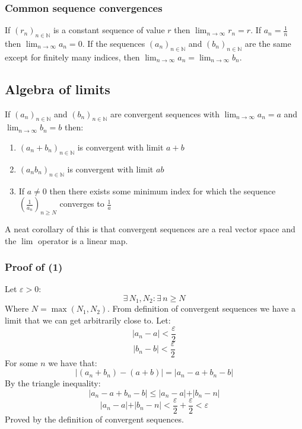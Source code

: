 \documentclass[12pt]{article}
\newcommand{\seq}[2]{(#1_#2)_{#2\in\mathbb{N}}}
\begin{document}
\subsubsection*{Common sequence convergences}
If \(\seq{r}{n}\) is a constant sequence of value \(r\) then \(\lim_{n\to\infty}r_n=r\). If \(a_n=\frac{1}{n}\) then \(\lim_{n\to\infty}a_n=0\). If the sequences \(\seq{a}{n}\) and \(\seq{b}{n}\) are the same except for finitely many indices, then \(\lim_{n\to\infty}a_n=\lim_{n\to\infty}b_n\).
\subsection*{Algebra of limits}
If \(\seq{a}{n}\) and \(\seq{b}{n}\) are convergent sequences with \(\lim_{n\to\infty}a_n=a\) and \(\lim_{n\to\infty}b_n=b\) then:
\begin{enumerate}
    \item \(\seq{a_n+b}{n}\) is convergent with limit \(a+b\)
    \item \(\seq{a_nb}{n}\) is convergent with limit \(ab\)
    \item If \(a\ne0\) then there exists some minimum index for which the sequence \(\left(\frac{1}{a_n}\right)_{n\geq N}\) converges to \(\frac{1}{a}\)
\end{enumerate}
A neat corollary of this is that convergent sequences are a real vector space and the \(\lim\) operator is a linear map.
\subsubsection*{Proof of (1)}
Let \(\varepsilon>0\):
\[\exists\, N_1,N_2:\exists\,n\geq N\]
Where \(N=\max(N_1,N_2)\). From definition of convergent sequences we have a limit that we can get arbitrarily close to. Let:
\[\vert a_n-a\vert<\frac{\varepsilon}{2}\]
\[\vert b_n-b\vert<\frac{\varepsilon}{2}\]
For some \(n\) we have that:
\[\vert (a_n+b_n)-(a+b)\vert=\vert a_n-a+b_n-b\vert\]
By the triangle inequality:
\[\vert a_n-a+b_n-b\vert\leq \vert a_n-a\vert+\vert b_n-n\vert\]
\[\vert a_n-a\vert+\vert b_n-n\vert<\frac{\varepsilon}{2}+\frac{\varepsilon}{2}<\varepsilon\]
Proved by the definition of convergent sequences.
\end{document}
